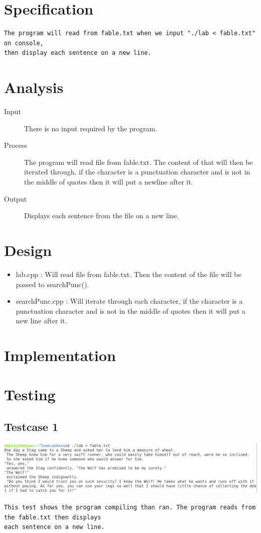 \documentclass{article}
\begin{document}
\newpage\section*{Specification}
\begin{verbatim}
The program will read from fable.txt when we input "./lab < fable.txt" on console, 
then display each sentence on a new line.
\end{verbatim}

\newpage\section*{Analysis}
\begin{description}
  \item[Input] There is no input required by the program.
  \item[Process] The program will read file from fable.txt. The content of that will then be iterated through. if the character is a punctuation character and is not in the middle of quotes then it will put a newline after it.
  \item[Output] Displays each sentence  from the file on a new line.
\end{description}

\newpage\section*{Design}
\begin{itemize}
	\item lab.cpp : Will read file from fable.txt. Then the content of the file will be passed to searchPunc().
	\item searchPunc.cpp : Will iterate through each character, if the character is a punctuation character and is not in the middle of quotes then it will put a new line after it.
\end{itemize}

\newpage\section*{Implementation}
\newpage{}
\newpage
\newpage

\newpage\section*{Testing}
\subsection*{Testcase 1}
\includegraphics[scale=0.5]{test.png} 
\begin{verbatim}
This test shows the program compiling than ran. The program reads from the fable.txt then displays
each sentence on a new line.
\end{verbatim}
\newpage
\end{document}
